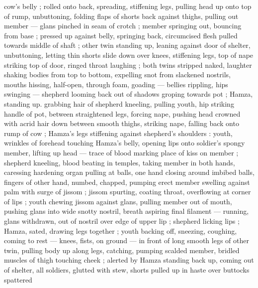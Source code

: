 cow's belly ; rolled onto back, spreading, stiffening legs, pulling head up onto top of rump, unbuttoning, folding flaps of shorts back against thighs, pulling out member --- glans pinched in seam of crotch ; member springing out, bouncing from base ; pressed up against belly, springing back, circumcised flesh pulled towards middle of shaft ; other twin standing up, leaning against door of shelter, unbuttoning, letting thin shorts slide down over knees, stiffening legs, top of nape striking top of door, ringed throat laughing ; both twins stripped naked, laughter shaking bodies from top to bottom, expelling snot from slackened nostrils, mouths hissing, half-open, through foam, goading --- bellies rippling, hips swinging --- shepherd looming back out of shadows groping towards pot ; Hamza, standing up. grabbing hair of shepherd kneeling, pulling youth, hip striking handle of pot, between straightened legs, forcing nape, pushing head crowned with acrid hair down between smooth thighs, striking nape, falling back onto rump of cow ; Hamza's legs stiffening against shepherd's shoulders : youth, wrinkles of forehead touching Hamza's belly, opening lips onto soldier's spongy member, lifting up head --- trace of blood marking place of kiss on member ; shepherd kneeling, blood beating in temples, taking member in both hands, caressing hardening organ pulling at balls, one hand closing around imbibed balls, fingers of other hand, numbed, chapped, pumping erect member swelling against palm with surge of jissom ; jissom spurting, coating throat, overflowing at corner of lips ; youth chewing jissom against glans, pulling member out of mouth, pushing glans into wide snotty nostril, breath aspiring final filament --- running, glans withdrawn, out of nostril over edge of upper lip ; shepherd licking lips ; Hamza, sated, drawing legs together ; youth backing off, sneezing, coughing, coming to rest --- knees, fists, on ground --- in front of long smooth legs of other twin, pulling body up along legs, catching, pumping scalded member, bridled muscles of thigh touching cheek ; alerted by Hamza standing back up, coming out of shelter, all soldiers, glutted with stew, shorts pulled up in haste over buttocks spattered 